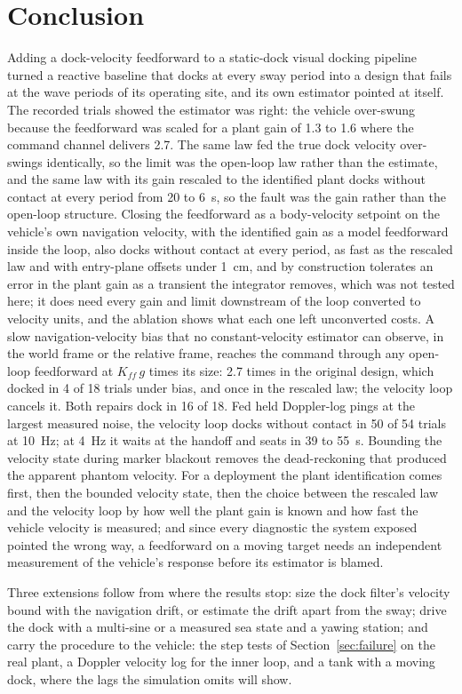 \section{Conclusion}
\label{sec:conclusion}

Adding a dock-velocity feedforward to a static-dock visual docking pipeline turned a reactive baseline that docks at every sway period into a design that fails at the wave periods of its operating site, and its own estimator pointed at itself. The recorded trials showed the estimator was right: the vehicle over-swung because the feedforward was scaled for a plant gain of 1.3 to 1.6 where the command channel delivers 2.7. The same law fed the true dock velocity over-swings identically, so the limit was the open-loop law rather than the estimate, and the same law with its gain rescaled to the identified plant docks without contact at every period from 20 to 6~s, so the fault was the gain rather than the open-loop structure. Closing the feedforward as a body-velocity setpoint on the vehicle's own navigation velocity, with the identified gain as a model feedforward inside the loop, also docks without contact at every period, as fast as the rescaled law and with entry-plane offsets under 1~cm, and by construction tolerates an error in the plant gain as a transient the integrator removes, which was not tested here; it does need every gain and limit downstream of the loop converted to velocity units, and the ablation shows what each one left unconverted costs. A slow navigation-velocity bias that no constant-velocity estimator can observe, in the world frame or the relative frame, reaches the command through any open-loop feedforward at $K_{ff}\,g$ times its size: 2.7 times in the original design, which docked in 4 of 18 trials under bias, and once in the rescaled law; the velocity loop cancels it. Both repairs dock in 16 of 18. Fed held Doppler-log pings at the largest measured noise, the velocity loop docks without contact in 50 of 54 trials at 10~Hz; at 4~Hz it waits at the handoff and seats in 39 to 55~s. Bounding the velocity state during marker blackout removes the dead-reckoning that produced the apparent phantom velocity. For a deployment the plant identification comes first, then the bounded velocity state, then the choice between the rescaled law and the velocity loop by how well the plant gain is known and how fast the vehicle velocity is measured; and since every diagnostic the system exposed pointed the wrong way, a feedforward on a moving target needs an independent measurement of the vehicle's response before its estimator is blamed.

Three extensions follow from where the results stop: size the dock filter's velocity bound with the navigation drift, or estimate the drift apart from the sway; drive the dock with a multi-sine or a measured sea state and a yawing station; and carry the procedure to the vehicle: the step tests of Section~\ref{sec:failure} on the real plant, a Doppler velocity log for the inner loop, and a tank with a moving dock, where the lags the simulation omits will show.
